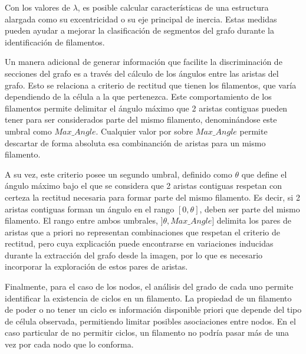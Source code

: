 Con los valores de $\lambda$, es posible calcular caracter\'isticas de una estructura alargada como su excentricidad o su eje principal de inercia. Estas medidas pueden ayudar a mejorar la clasificaci\'on de segmentos del grafo durante la identificaci\'on de filamentos.


Un manera adicional de generar informaci\'on que facilite la discriminaci\'on de secciones del grafo es a trav\'es del c\'alculo de los \'angulos entre las aristas del grafo. Esto se relaciona a criterio de rectitud que tienen los filamentos, que var\'ia dependiendo de la c\'elula a la que pertenezca. Este comportamiento de los filamentos permite delimitar el \'angulo m\'aximo que 2 aristas contiguas pueden tener para ser considerados parte del mismo filamento, denomin\'andose este umbral como $Max\_Angle$. Cualquier valor por sobre $Max\_Angle$ permite descartar de forma absoluta esa combinanci\'on de aristas para un mismo filamento. 


A su vez, este criterio posee un segundo umbral, definido como $\theta$  que define el \'angulo m\'aximo bajo el que se considera que 2 aristas contiguas respetan con certeza la rectitud necesaria para formar parte del mismo filamento. Es decir, si 2 aristas contiguas forman un \'angulo en el rango $[0, \theta]$, deben ser parte del mismo filamento. El rango entre ambos umbrales, $]\theta, Max\_Angle]$ delimita los pares de aristas que a priori no representan combinaciones que respetan el criterio de rectitud, pero cuya explicaci\'on puede encontrarse en variaciones inducidas durante la extracci\'on del grafo desde la imagen, por lo que es necesario incorporar la exploraci\'on de estos pares de aristas.


Finalmente, para el caso de los nodos, el an\'alisis del grado de cada uno permite identificar la existencia de ciclos\cite{wilson1979introduction} en un filamento. La propiedad de un filamento de poder o no tener un ciclo es informaci\'on disponible priori que depende del tipo de c\'elula observada, permitiendo limitar posibles asociaciones entre nodos. En el caso particular de no permitir ciclos, un filamento no podr\'ia pasar m\'as de una vez por cada nodo que lo conforma. 




